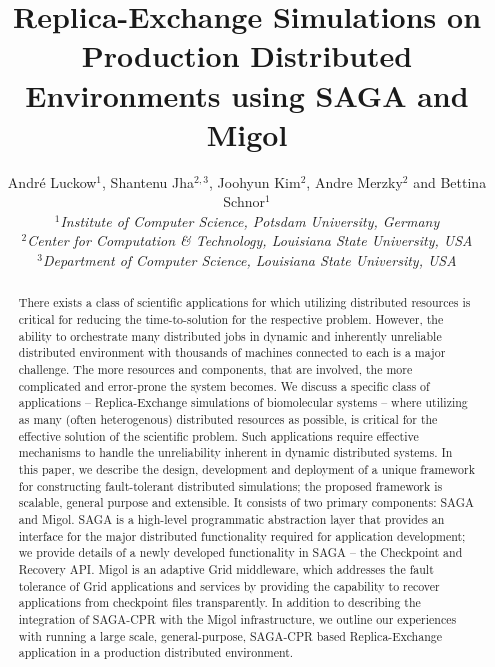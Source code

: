 \documentclass[times, 10pt, twocolumn]{article}
\title{Replica-Exchange Simulations on Production Distributed
  Environments using SAGA and Migol}
\author{
  Andr\'e Luckow$^{1}$, Shantenu Jha$^{2,3}$, Joohyun Kim$^{2}$, Andre Merzky$^{2}$ and Bettina Schnor$^{1}$\\
  \small{\emph{$^{1}$Institute of Computer Science, Potsdam University, Germany}}\\
  \small{\emph{$^{2}$Center for Computation \& Technology, Louisiana State University, USA}}\\
  \small{\emph{$^{3}$Department of Computer Science, Louisiana State University, USA}}\\
}
\begin{document}
 


\maketitle    

\begin{abstract}
  There exists a class of scientific applications for which utilizing
  distributed resources is critical for reducing the time-to-solution for
  the respective problem. However, the ability to orchestrate 
  many distributed jobs in dynamic and inherently unreliable distributed environment
  with thousands of machines connected to
  each is a major challenge. The more resources and components,
  that are involved, %
  the more complicated  and error-prone the system becomes. We discuss a specific class of
  applications -- Replica-Exchange simulations of biomolecular systems
  -- where utilizing as many (often heterogenous) distributed
  resources as possible, is critical for the effective solution of the
  scientific problem. Such applications require effective mechanisms to handle the
  unreliability inherent in dynamic distributed systems. 
  In this paper, we describe the design, development and
  deployment of a unique framework for constructing fault-tolerant
  distributed simulations; %
  the proposed framework is scalable,
  general purpose and extensible. It consists of two primary
  components: SAGA and Migol.  SAGA is a high-level programmatic
  abstraction layer that provides an interface for the major
  distributed functionality required for application development; we
  provide details of a newly developed functionality in SAGA -- the
  Checkpoint and Recovery API. Migol is an adaptive Grid middleware,
  which addresses the fault tolerance of Grid applications and
  services by providing the capability to recover applications from
  checkpoint files transparently.  In addition to describing 
  the integration of SAGA-CPR with the Migol infrastructure, 
  we outline our experiences with
  running a large scale, general-purpose, SAGA-CPR based
  Replica-Exchange application in a production distributed
  environment.

    

\end{abstract}
\end{document}
